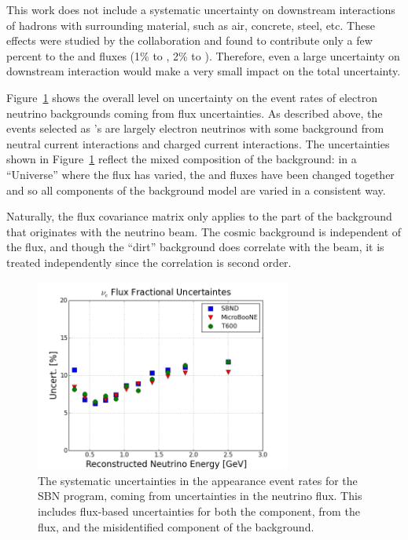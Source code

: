 This work does not include a systematic uncertainty on downstream interactions of hadrons with surrounding material, such as air, concrete, steel, etc.  These effects were studied by the \MB collaboration and found to contribute only a few percent to the \nue and \numu fluxes (1\% to \numu, 2\% to \nue).  Therefore, even a large uncertainty on downstream interaction would make a very small impact on the total uncertainty.

Figure~\ref{fig:sys_flux_uncert_fracUncert} shows the overall level on uncertainty on the event rates of electron neutrino backgrounds coming from flux uncertainties.  As described above, the events selected as \nue's are largely electron neutrinos with some background from neutral current interactions and charged current \numu interactions.  The uncertainties shown in Figure~\ref{fig:sys_flux_uncert_fracUncert} reflect the mixed composition of the background: in a ``Universe'' where the flux has varied, the \nue and \numu fluxes have been changed together and so all components of the background model are varied in a consistent way.

Naturally, the flux covariance matrix only applies to the part of the background that originates with the neutrino beam.  The cosmic background is independent of the flux, and though the ``dirt'' background does correlate with the beam, it is treated independently since the correlation is second order.

\begin{figure}[]
    \centering
    \includegraphics[width=0.75\textwidth]{systematics_figures/matrixFile_nue_ND_100m_uB_T600_onaxis_flux_6_ecalo2_nu_vePhot0.05_gap3_fracUncert}
    \caption[Fractional Flux Uncertainties]{The systematic uncertainties in the \nue appearance event rates for the SBN program, coming from uncertainties in the neutrino flux.  This includes flux-based uncertainties for both the \nue component, from the \nue flux, and the \numu misidentified component of the background.}
   \label{fig:sys_flux_uncert_fracUncert}
\end{figure}


